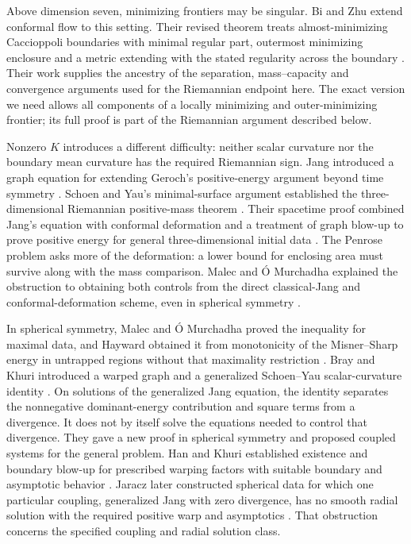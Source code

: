 Above dimension seven, minimizing frontiers may be singular. Bi and
Zhu extend conformal flow to this setting. Their revised theorem treats
almost-minimizing Caccioppoli boundaries with minimal regular part,
outermost minimizing enclosure and a metric extending with the stated
regularity across the boundary \cite{BiZhu2026v2}. Their work
supplies the ancestry of the separation, mass--capacity and convergence
arguments used for the Riemannian endpoint here. The exact version we
need allows all components of a locally minimizing and outer-minimizing
frontier; its full proof is part of the Riemannian argument described
below.

Nonzero $K$ introduces a different difficulty: neither scalar curvature
nor the boundary mean curvature has the required Riemannian sign.
Jang introduced a graph equation for extending Geroch's positive-energy
argument beyond time symmetry \cite{Jang1978}. Schoen and Yau's
minimal-surface argument established the three-dimensional Riemannian
positive-mass theorem \cite{SchoenYau1979}. Their spacetime proof combined
Jang's equation with conformal deformation and a treatment of graph
blow-up to prove positive energy for general three-dimensional initial
data \cite{SchoenYau1981}. The Penrose problem asks more of the deformation:
a lower bound for enclosing area must survive along with the mass
comparison. Malec and \'O Murchadha explained the obstruction to obtaining
both controls from the direct classical-Jang and conformal-deformation
scheme, even in spherical symmetry \cite{Malec}.

In spherical symmetry, Malec and \'O Murchadha proved the inequality
for maximal data, and Hayward obtained it from monotonicity of the
Misner--Sharp energy in untrapped regions without that maximality
restriction \cite{MalecOMurchadha1994,Hayward1996}.
Bray and Khuri introduced a warped graph and a generalized Schoen--Yau
scalar-curvature identity \cite{BrayKhuri2010,BrayKhuri2011}. On solutions
of the generalized Jang equation, the identity separates the
nonnegative dominant-energy contribution and square terms from a
divergence. It does not by itself solve the equations needed to control
that divergence. They gave a new proof in spherical symmetry and
proposed coupled systems for the general problem. Han and Khuri
established existence and boundary blow-up for prescribed warping
factors with suitable boundary and asymptotic behavior \cite{HanKhuri}. Jaracz
later constructed spherical data for which one particular coupling,
generalized Jang with zero divergence, has no smooth radial solution
with the required positive warp and asymptotics \cite{Jaracz2023}. That
obstruction concerns the specified coupling and radial solution class.

